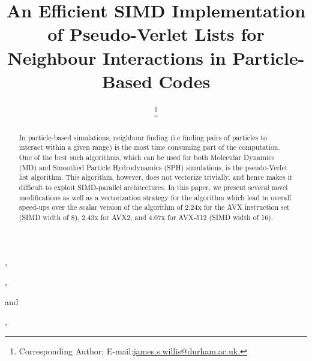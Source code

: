 \documentclass{IOS-Book-Article}
\def\hb{\hbox to 10.7 cm{}}
\begin{document}

\pagestyle{headings}
\def\thepage{}

\begin{frontmatter}              %

\title{An Efficient SIMD Implementation of Pseudo-Verlet Lists for Neighbour Interactions in Particle-Based Codes}

\markboth{}{September 2017\hb}

\author[A]{ %
\thanks{Corresponding Author; E-mail:\url{james.s.willis@durham.ac.uk.}}},
\author[A]{ },
\author[B,C]{ }
\author[A]{ }
and
\author[A]{ },

\address[A]{Institute for Computational
Cosmology (ICC),
Department of Physics,
Durham University,
Durham DH1 3LE, UK}
\address[B]{School of Engineering and
Computing Sciences,
Durham University,
Durham DH1 3LE, UK}
\address[C]{Google Switzerland GmbH,
8002 Z{\"u}rich, Switzerland}

\begin{abstract}
In particle-based simulations, neighbour finding (i.e finding pairs of particles to interact within a given range) is the most time consuming part of the computation. One of the best such algorithms, which can be used for both Molecular Dynamics (MD) and Smoothed Particle Hydrodynamics (SPH) simulations, is the pseudo-Verlet list algorithm. This algorithm, however, does not vectorize trivially, and hence makes it difficult to exploit SIMD-parallel architectures. In this paper, we present several novel modifications as well as a vectorization strategy for the algorithm which lead to overall speed-ups over the scalar version of the algorithm of 2.24x for the AVX instruction set (SIMD width of 8), 2.43x for AVX2, and 4.07x for AVX-512 (SIMD width of 16).
\end{abstract}


\end{frontmatter}
\end{document}
